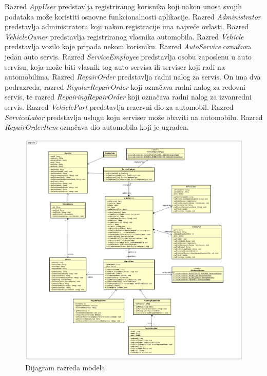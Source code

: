 		Razred \textit{AppUser} predstavlja registriranog korisnika koji nakon unosa svojih podataka može koristiti osnovne funkcionalnosti aplikacije. Razred \textit{Administrator} predstavlja administratora koji nakon registracije ima najveće ovlasti. Razred \textit{VehicleOwner} predstavlja registriranog vlasnika automobila. Razred \textit{Vehicle} predstavlja vozilo koje pripada nekom korisniku. Razred \textit{AutoService} označava jedan auto servis. Razred \textit{ServiceEmployee} predstavlja osobu zaposlenu u auto servisu, koja može biti vlasnik tog auto servisa ili serviser koji radi na automobilima. Razred \textit{RepairOrder} predstavlja radni nalog za servis. On ima dva podrazreda, razred \textit{RegularRepairOrder} koji označava radni nalog za redovni servis, te razred \textit{RepairingRepairOrder} koji označava radni nalog za izvanredni servis. Razred \textit{VehiclePart} predstavlja rezervni dio za automobil. Razred \textit{ServiceLabor} predstavlja uslugu koju serviser može obaviti na automobilu. Razred \textit{RepairOrderItem} označava dio automobila koji je ugrađen.
			
		\begin{figure}[h]
			\centering
			\includegraphics[width=1.0\linewidth]{dijagrami/class_diagram}
			\caption{Dijagram razreda modela}
			\label{fig:classdiagram}
		\end{figure}
	

